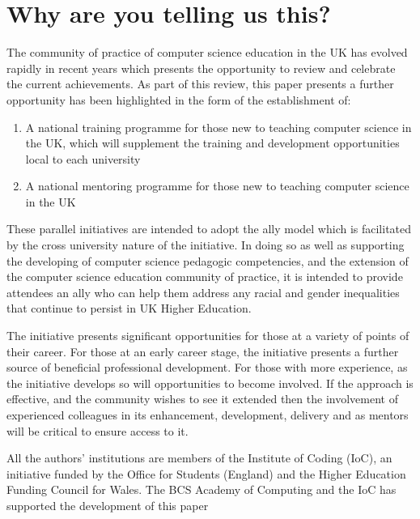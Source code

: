\documentclass[sigconf]{acmart}
\begin{document}
\section{Why are you telling us this?}	
The community of practice of computer science education in the UK has evolved rapidly in recent years which presents the opportunity to  review and celebrate the current achievements. As part of this review, this paper presents a further opportunity has been highlighted in the form of the establishment of:
\begin{enumerate}
\item A national training programme for those new to teaching computer science in the UK, which will supplement the training and development opportunities local to each university
\item A national mentoring programme for those new to teaching computer science in the UK
\end{enumerate}
These parallel initiatives are intended to adopt the ally model which is facilitated by the cross university nature of the initiative. In doing so as well as supporting the developing of computer science pedagogic competencies, and  the extension of the computer science education community of practice, it is intended to provide attendees an ally who can help them address any racial and gender inequalities that continue to persist in UK Higher Education.

The initiative presents significant opportunities for those at a variety of points of their career. For those at an early career stage, the initiative presents a further source of beneficial professional development. For those with more experience, as the initiative develops so will opportunities to become involved. If the approach is effective, and the community wishes to see it extended then the involvement of experienced colleagues in its enhancement, development, delivery and as mentors will be critical to ensure access to it.

\begin{acks}
 
  All the authors' institutions are members of the Institute of Coding (IoC), an initiative funded by the Office for Students (England) and the Higher Education Funding Council for Wales. The BCS Academy of Computing and the IoC has supported the development of this paper
 

\end{acks}





\balance
\end{document}
